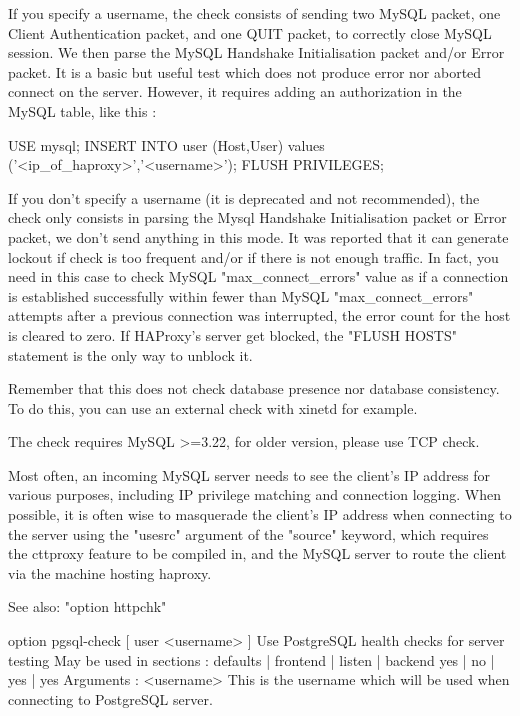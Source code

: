   If you specify a username, the check consists of sending two MySQL packet,
  one Client Authentication packet, and one QUIT packet, to correctly close
  MySQL session. We then parse the MySQL Handshake Initialisation packet and/or
  Error packet. It is a basic but useful test which does not produce error nor
  aborted connect on the server. However, it requires adding an authorization
  in the MySQL table, like this :

      USE mysql;
      INSERT INTO user (Host,User) values ('<ip_of_haproxy>','<username>');
      FLUSH PRIVILEGES;

  If you don't specify a username (it is deprecated and not recommended), the
  check only consists in parsing the Mysql Handshake Initialisation packet or
  Error packet, we don't send anything in this mode. It was reported that it
  can generate lockout if check is too frequent and/or if there is not enough
  traffic. In fact, you need in this case to check MySQL "max_connect_errors"
  value as if a connection is established successfully within fewer than MySQL
  "max_connect_errors" attempts after a previous connection was interrupted,
  the error count for the host is cleared to zero. If HAProxy's server get
  blocked, the "FLUSH HOSTS" statement is the only way to unblock it.

  Remember that this does not check database presence nor database consistency.
  To do this, you can use an external check with xinetd for example.

  The check requires MySQL >=3.22, for older version, please use TCP check.

  Most often, an incoming MySQL server needs to see the client's IP address for
  various purposes, including IP privilege matching and connection logging.
  When possible, it is often wise to masquerade the client's IP address when
  connecting to the server using the "usesrc" argument of the "source" keyword,
  which requires the cttproxy feature to be compiled in, and the MySQL server
  to route the client via the machine hosting haproxy.

  See also: "option httpchk"

option pgsql-check [ user <username> ]
  Use PostgreSQL health checks for server testing
  May be used in sections :   defaults | frontend | listen | backend
                                 yes   |    no    |   yes  |   yes
  Arguments :
    <username> This is the username which will be used when connecting to
               PostgreSQL server.

